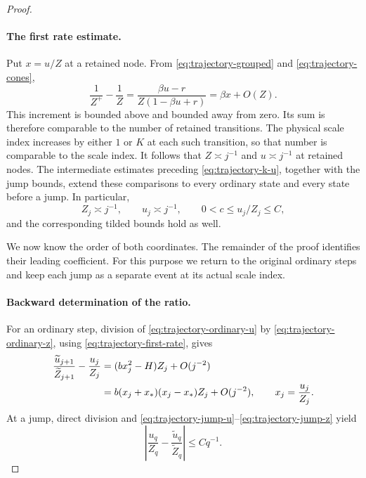 \begin{proof}
\paragraph{The first rate estimate.}
Put $x=u/Z$ at a retained node.  From
\eqref{eq:trajectory-grouped} and \eqref{eq:trajectory-cones},
\[
 \frac1{Z^+}-\frac1Z
   =\frac{\beta u-r}{Z(1-\beta u+r)}
   =\beta x+O(Z).
\]
This increment is bounded above and bounded away from zero.  Its
sum is therefore comparable to the number of retained transitions.
The physical scale index increases by either $1$ or $K$ at each
such transition, so that number is comparable to the scale index.
It follows that $Z\asymp j^{-1}$ and $u\asymp j^{-1}$ at retained
nodes.  The intermediate estimates preceding
\eqref{eq:trajectory-k-u}, together with the jump bounds, extend
these comparisons to every ordinary state and every state before a
jump.  In particular,
\begin{equation}
 Z_j\asymp j^{-1},\qquad u_j\asymp j^{-1},\qquad
 0<c\le u_j/Z_j\le C,
 \label{eq:trajectory-first-rate}
\end{equation}
and the corresponding tilded bounds hold as well.

We now know the order of both coordinates.  The remainder of the
proof identifies their leading coefficient.  For this purpose we
return to the original ordinary steps and keep each jump as a
separate event at its actual scale index.

\paragraph{Backward determination of the ratio.}
For an ordinary step, division of
\eqref{eq:trajectory-ordinary-u} by
\eqref{eq:trajectory-ordinary-z}, using
\eqref{eq:trajectory-first-rate}, gives
\begin{align}
 \frac{\widetilde u_{j+1}}{\widetilde Z_{j+1}}
          -\frac{u_j}{Z_j}
   &=(b x_j^2-H)Z_j+O(j^{-2})\notag\\
   &=b(x_j+x_*)(x_j-x_*)Z_j+O(j^{-2}),
 \qquad x_j=\frac{u_j}{Z_j}.
 \label{eq:trajectory-ratio-step}
\end{align}
At a jump, direct division and
\eqref{eq:trajectory-jump-u}--\eqref{eq:trajectory-jump-z} yield
\begin{equation}
 \left|\frac{u_q}{Z_q}
            -\frac{\widetilde u_q}{\widetilde Z_q}\right|
       \le Cq^{-1}.
 \label{eq:trajectory-ratio-jump}
\end{equation}


\end{proof}
